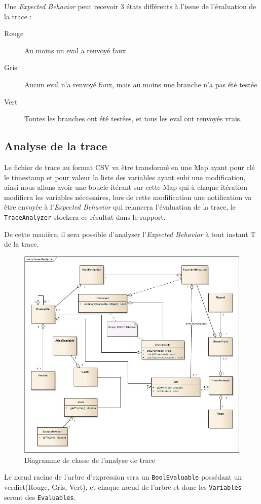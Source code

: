 Une \textit{Expected Behavior} peut recevoir 3 états différents à l'issue de l'évaluation de la trace : 
\begin{description}
	\item[Rouge] Au moins un eval a renvoyé faux
	\item[Gris] Aucun eval n'a renvoyé faux, mais au moins une branche n'a pas été testée
	\item[Vert] Toutes les branches ont été testées, et tous les eval ont renvoyés vrais.
\end{description}

	\subsection{Analyse de la trace}
	Le fichier de trace au format CSV va être transformé en une Map ayant pour clé le timestamp et pour valeur la liste des variables ayant subi une
	modification, ainsi nous allons avoir une boucle itérant sur cette Map qui à chaque itération modifiera les variables nécessaires, lors de cette modification
	une notification va être envoyée à l'\textit{Expected Behavior} qui relancera l'évaluation de la trace, le \texttt{TraceAnalyzer} stockera ce résultat dans le rapport. 

	De cette manière, il sera possible d'analyser l'\textit{Expected Behavior} à tout instant T de la trace.
	\vfill~\vfill

 	\begin{figure}[H]
 		\centering
 		\includegraphics[width=17.5cm]{contents/images/TraceAnalyzer.jpg}
 		\caption{Diagramme de classe de l'analyse de trace}
 		\label{fig:diagLogique}
 	\end{figure}
 	Le n\oe{}ud racine de l'arbre d'expression sera un \texttt{BoolEvaluable} possédant un verdict(Rouge, Gris, Vert), et chaque n\oe{}ud de l'arbre et donc les \texttt{Variables} seront des \texttt{Evaluables}.
